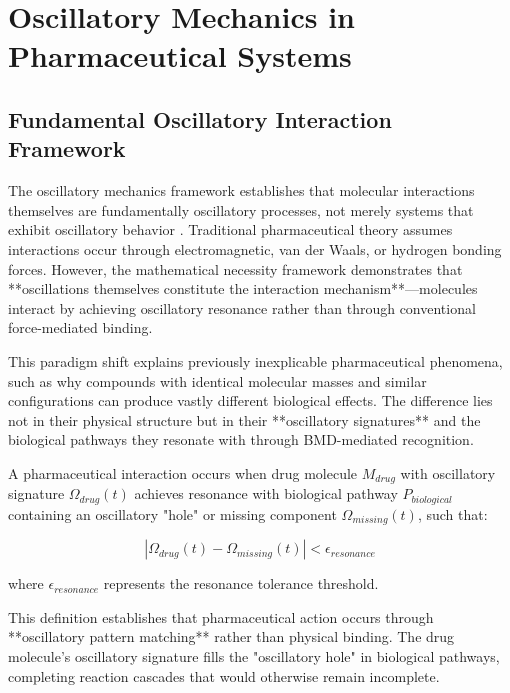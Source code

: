 \section{Oscillatory Mechanics in Pharmaceutical Systems}

\subsection{Fundamental Oscillatory Interaction Framework}

The oscillatory mechanics framework establishes that molecular interactions themselves are fundamentally oscillatory processes, not merely systems that exhibit oscillatory behavior \citep{arnold1978mathematical, goldstein2002classical}. Traditional pharmaceutical theory assumes interactions occur through electromagnetic, van der Waals, or hydrogen bonding forces. However, the mathematical necessity framework demonstrates that **oscillations themselves constitute the interaction mechanism**—molecules interact by achieving oscillatory resonance rather than through conventional force-mediated binding.

This paradigm shift explains previously inexplicable pharmaceutical phenomena, such as why compounds with identical molecular masses and similar configurations can produce vastly different biological effects. The difference lies not in their physical structure but in their **oscillatory signatures** and the biological pathways they resonate with through BMD-mediated recognition.

\begin{definition}
A pharmaceutical interaction occurs when drug molecule $M_{drug}$ with oscillatory signature $\Omega_{drug}(t)$ achieves resonance with biological pathway $P_{biological}$ containing an oscillatory "hole" or missing component $\Omega_{missing}(t)$, such that:

\begin{equation}
|\Omega_{drug}(t) - \Omega_{missing}(t)| < \epsilon_{resonance}
\end{equation}

where $\epsilon_{resonance}$ represents the resonance tolerance threshold.
\end{definition}

This definition establishes that pharmaceutical action occurs through **oscillatory pattern matching** rather than physical binding. The drug molecule's oscillatory signature fills the "oscillatory hole" in biological pathways, completing reaction cascades that would otherwise remain incomplete.

